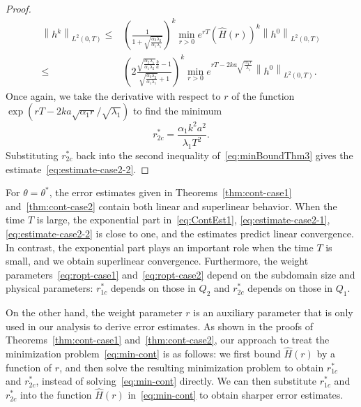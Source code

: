 \documentclass[10pt,a4paper]{amsart}
\newcommand{\norm}[1]{\left\lVert#1\right\rVert}
\begin{document}
\begin{proof}
\begin{equation}\label{eq:minBoundThm3}
\begin{aligned}
\norm{h^k}_{L^2(0, T)} \leq& \left(\frac{1}{1+\sqrt{\frac{\alpha_2\lambda_2}{\alpha_1\lambda_1}}}\right)^k\min_{r>0}e^{rT} \left(\hat H(r)\right)^k \norm{h^0}_{L^2(0, T)}
\\
\leq& \left(2\frac{\sqrt{\frac{\alpha_2 \lambda_1}{\alpha_1\lambda_2}}\frac{b}{a} - 1}{\sqrt{\frac{\alpha_2 \lambda_2}{\alpha_1\lambda_1}}+1}  \right)^k \min_{r>0}e^{rT - 2ka\sqrt{\frac{\alpha_1r}{\lambda_1}}}\norm{h^0}_{L^2(0, T)}.
\end{aligned}
\end{equation}
Once again, we take the derivative with respect to $r$ of the function $\exp(rT - 2ka\sqrt{\alpha_1r}/\sqrt{\lambda_1})$ to find the minimum 
\begin{equation}\label{eq:ropt-case2}
r^*_{2c} = \frac{\alpha_1 k^2a^2}{\lambda_1 T^2}.
\end{equation}
Substituting $r^*_{2c}$ back into the second inequality of~\eqref{eq:minBoundThm3} gives the estimate~\eqref{eq:estimate-case2-2}.
\end{proof}


For $\theta = \theta^*$, the error estimates given in Theorems~\ref{thm:cont-case1} and~\ref{thm:cont-case2} contain both linear and superlinear behavior. When the time $T$ is large, the exponential part in~\eqref{eq:ContEst1}, \eqref{eq:estimate-case2-1}, \eqref{eq:estimate-case2-2} is close to one, and the estimates predict linear convergence. In contrast, the exponential part plays an important role when the time $T$ is small, and we obtain superlinear convergence. 
Furthermore, the weight parameters~\eqref{eq:ropt-case1} and~\eqref{eq:ropt-case2} depend on the subdomain size and physical parameters: $r^*_{1c}$ depends on those in $Q_2$ and $r^*_{2c}$ depends on those in $Q_1$. 


On the other hand, the weight parameter $r$ is an auxiliary parameter that is only used in our analysis to derive error estimates. As shown in the proofs of Theorems~\ref{thm:cont-case1} and~\ref{thm:cont-case2}, our approach to treat the minimization problem~\eqref{eq:min-cont} is as follows: we first bound $\hat H(r)$ by a function of $r$, and then solve the resulting minimization problem to obtain $r^*_{1c}$ and $r^*_{2c}$, instead of solving~\eqref{eq:min-cont} directly. We can then substitute $r^*_{1c}$ and $r^*_{2c}$ into the function $\hat H(r)$ in~\eqref{eq:min-cont} to obtain sharper error estimates.
\end{document}
